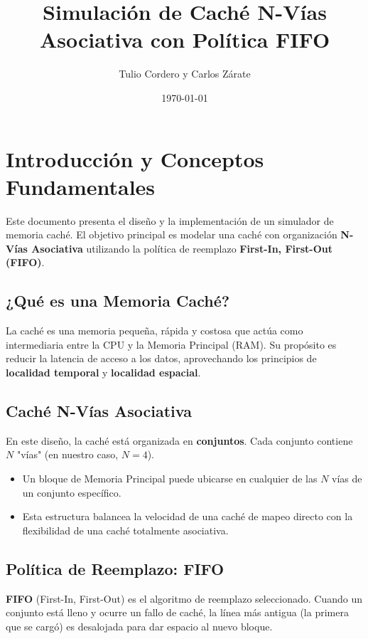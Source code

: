 \documentclass[12pt, a4paper]{article}
\title{Simulación de Caché N-Vías Asociativa con Política FIFO}
\author{Tulio Cordero y Carlos Zárate}
\date{\today}
\begin{document}
\maketitle
\thispagestyle{empty} %

\newpage
\tableofcontents
\newpage

\section{Introducción y Conceptos Fundamentales}
\label{sec:introduccion}

Este documento presenta el diseño y la implementación de un simulador de memoria caché. El objetivo principal es modelar una caché con organización \textbf{N-Vías Asociativa} utilizando la política de reemplazo \textbf{First-In, First-Out (FIFO)}.

\subsection{¿Qué es una Memoria Caché?}
La caché es una memoria pequeña, rápida y costosa que actúa como intermediaria entre la CPU y la Memoria Principal (RAM). Su propósito es reducir la latencia de acceso a los datos, aprovechando los principios de \textbf{localidad temporal} y \textbf{localidad espacial}.

\subsection{Caché N-Vías Asociativa}
En este diseño, la caché está organizada en \textbf{conjuntos}. Cada conjunto contiene $N$ "vías" (en nuestro caso, $N=4$).
\begin{itemize}[label=$\bullet$]
    \item Un bloque de Memoria Principal puede ubicarse en cualquier de las $N$ vías de un conjunto específico.
    \item Esta estructura balancea la velocidad de una caché de mapeo directo con la flexibilidad de una caché totalmente asociativa.
\end{itemize}

\subsection{Política de Reemplazo: FIFO}
\label{sec:fifo}
\textbf{FIFO} (First-In, First-Out) es el algoritmo de reemplazo seleccionado. Cuando un conjunto está lleno y ocurre un fallo de caché, la línea más antigua (la primera que se cargó) es desalojada para dar espacio al nuevo bloque.
\end{document}
